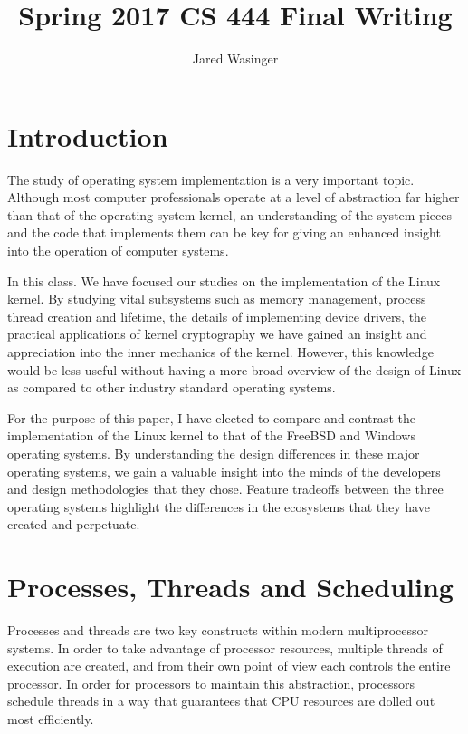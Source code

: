 \documentclass[onecolumn,10pt]{IEEETran}
\title{Spring 2017 CS 444 Final Writing}
\author{Jared Wasinger}
\begin{document}
\maketitle


\section{Introduction}
The study of operating system implementation is a very important topic.  Although most computer professionals operate at a level of abstraction far higher than that of the operating system kernel, an understanding of the system pieces and the code that implements them can be key for giving an enhanced insight into the operation of computer systems.

In this class.  We have focused our studies on the implementation of the Linux kernel.  By studying vital subsystems such as memory management, process thread creation and lifetime, the details of implementing device drivers, the practical applications of kernel cryptography we have gained an insight and appreciation into the inner mechanics of the kernel.  However, this knowledge would be less useful without having a more broad overview of the design of Linux as compared to other industry standard operating systems.

For the purpose of this paper, I have elected to compare and contrast the implementation of the Linux kernel to that of the FreeBSD and Windows operating systems.  By understanding the design differences in these major operating systems, we gain a valuable insight into the minds of the developers and design methodologies that they chose.  Feature tradeoffs between the three operating systems highlight the differences in the ecosystems that they have created and perpetuate.

\section{Processes, Threads and Scheduling}
Processes and threads are two key constructs within modern multiprocessor systems.  In order to take advantage of processor resources, multiple threads of execution are created, and from their own point of view each controls the entire processor.  In order for processors to maintain this abstraction, processors schedule threads in a way that guarantees that CPU resources are dolled out most efficiently.
\end{document}

